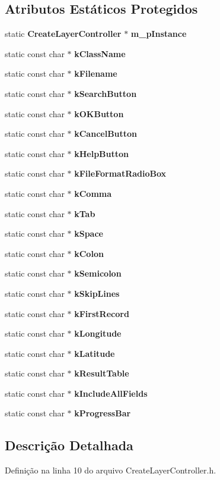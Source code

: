 \subsection*{Atributos Estáticos Protegidos}
\begin{DoxyCompactItemize}
\item 
static {\bf Create\+Layer\+Controller} $\ast$ {\bf m\+\_\+p\+Instance}
\item 
static const char $\ast$ {\bf k\+Class\+Name}
\item 
static const char $\ast$ {\bf k\+Filename}
\item 
static const char $\ast$ {\bf k\+Search\+Button}
\item 
static const char $\ast$ {\bf k\+O\+K\+Button}
\item 
static const char $\ast$ {\bf k\+Cancel\+Button}
\item 
static const char $\ast$ {\bf k\+Help\+Button}
\item 
static const char $\ast$ {\bf k\+File\+Format\+Radio\+Box}
\item 
static const char $\ast$ {\bf k\+Comma}
\item 
static const char $\ast$ {\bf k\+Tab}
\item 
static const char $\ast$ {\bf k\+Space}
\item 
static const char $\ast$ {\bf k\+Colon}
\item 
static const char $\ast$ {\bf k\+Semicolon}
\item 
static const char $\ast$ {\bf k\+Skip\+Lines}
\item 
static const char $\ast$ {\bf k\+First\+Record}
\item 
static const char $\ast$ {\bf k\+Longitude}
\item 
static const char $\ast$ {\bf k\+Latitude}
\item 
static const char $\ast$ {\bf k\+Result\+Table}
\item 
static const char $\ast$ {\bf k\+Include\+All\+Fields}
\item 
static const char $\ast$ {\bf k\+Progress\+Bar}
\end{DoxyCompactItemize}


\subsection{Descrição Detalhada}


Definição na linha 10 do arquivo Create\+Layer\+Controller.\+h.




